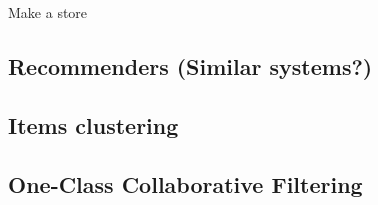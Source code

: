 Make a store















\subsection{Recommenders (Similar systems?)}
\subsection{Items clustering}
\subsection{One-Class Collaborative Filtering}




